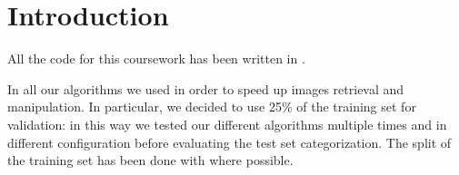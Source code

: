 \clearpage
\section{Introduction}
All the code for this coursework has been written in \MATLAB. 

In all our algorithms we used  in order to speed up images retrieval and manipulation. In particular, we decided to use 25\% of the training set for validation: in this way we tested our different algorithms multiple times and in different configuration before evaluating the test set categorization. The split of the training set has been done with  where possible.